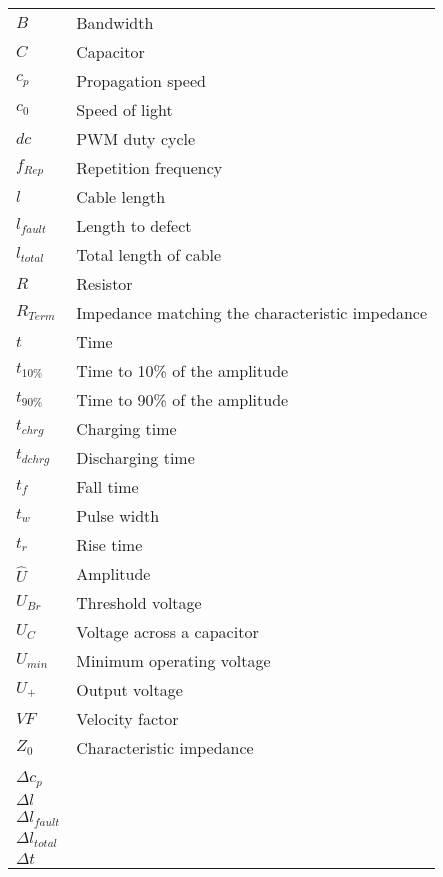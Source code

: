 \begin{table}[h]
    \begin{tabular}{@{}ll@{}}%
        \( B \) & Bandwidth\\
        \( C \) & Capacitor\\
        \( c_p \) & Propagation speed\\
        \( c_0 \) & Speed of light\\
        \( dc \) & PWM duty cycle \\
		\( f_{Rep} \) & Repetition frequency\\
		\( l \) & Cable length\\
		\( l_{fault} \) & Length to defect\\
        \( l_{total} \) & Total length of cable\\
        \( R \) & Resistor\\
		\( R_{Term} \) & Impedance matching the characteristic impedance\\
        \( t \) & Time\\
        \( t_{10\%} \) & Time to 10\% of the amplitude\\
        \( t_{90\%} \) & Time to 90\% of the amplitude\\
		\( t_{chrg} \) & Charging time\\
		\( t_{dchrg} \) & Discharging time\\
		\( t_f \) & Fall time\\
		\( t_w \) & Pulse width\\
		\( t_{r} \) & Rise time\\
		\( \hat{U} \) & Amplitude\\
        \( U_{Br} \) & Threshold voltage\\
        \( U_C \) & Voltage across a capacitor \\
		\( U_{min} \) & Minimum operating voltage\\
		\( U_{+} \) & Output voltage\\
		\( VF \) & Velocity factor\\
        \( Z_0 \) & Characteristic impedance\\
        & \\
        \( \Delta c_p \) & \\
        \( \Delta l \) & \\
        \( \Delta l_{fault} \) & \\
        \( \Delta l_{total} \) & \\
        \( \Delta t \) & \\

\end{tabular}
\end{table}
